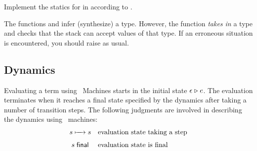 \documentclass[11pt]{article}
\begin{document}
Implement the statics for \LangKPCFv{} in 
according to .

\begin{remark}
  The functions  and  infer (synthesize) a type.
  However, the function  \emph{takes in} a type and checks that the stack can accept values of that type.
  If an erroneous situation is encountered, you should raise  as usual.
\end{remark}

\subsection{Dynamics}

Evaluating a \LangKPCFv{} term using \MachK~Machines starts in the initial state ${\mathord{\epsilon}}\mathrel{\triangleright}{e}$.
%
The evaluation terminates when it reaches a final state specified by the dynamics after taking a number of transition steps.
The following judgments are involved in describing the dynamics using \MachK~machines:
%
\[
  \begin{array}{c l}
    s \StepsTo s & \text{evaluation state taking a step} \vspace{0.3em} \\
    \IsFinal{s} & \text{evaluation state is final}
  \end{array}
\]
\end{document}

